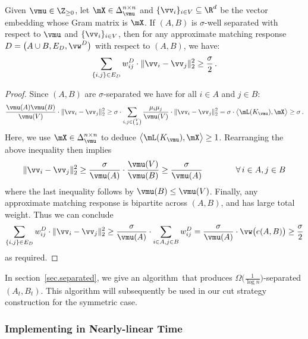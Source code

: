 \documentclass[letterpaper]{article}
\begin{document}
\begin{lemma}
\label{lem.sym-cut-strat.loss}
Given $\vmu \in \Z_{\geq 0}$, let $\mX \in \Delta_{\vmu}^{n \times n}$ and $\{ \vv_i \}_{i \in V} \subseteq \R^d$ be the vector embedding whose Gram matrix is $\mX$. If $(A, B)$ is $\sigma$-well separated with respect to $\vmu$ and $\{ \vv_i \}_{i \in V}$, then for any approximate matching response $D = \big( A \cup B, E_D, \vw^D \big)$ with respect to $(A, B)$, we have:
\begin{equation*}
\sum_{\{ i, j \} \in E_D} w_{ij}^{D} \cdot \lVert \vv_i - \vv_j \rVert_2^2
\geq {\sigma \over 2} \, .
\end{equation*}
\end{lemma}
\begin{proof}
Since $(A, B)$ are $\sigma$-separated we have for all $i \in A$ and $j \in B$:
\begin{equation*}
\frac{\vmu(A) \vmu(B)}{\vmu(V)} \cdot \lVert \vv_i - \vv_j \rVert^2_2
\geq \sigma \cdot \sum_{i,j \in \binom{V}{2}} \frac{\mu_i \mu_j}{\vmu(V)} \cdot \lVert \vv_i - \vv_j \rVert^2_2
= \sigma \cdot \big\langle \mL(K_{\vmu}), \mX \big\rangle
\geq \sigma \, .
\end{equation*}
Here, we use $\mX \in \Delta_{\vmu}^{n \times n}$ to deduce $\big\langle \mL(K_{\vmu}), \mX \big\rangle \geq 1$. Rearranging the above inequality then implies
\begin{equation*}
\lVert \vv_i - \vv_j \rVert_2^2
\geq \frac{\sigma}{\vmu(A)} \cdot \frac{\vmu(V)}{\vmu(B)}
\geq \frac{\sigma}{\vmu(A)}
\qquad\qquad
\forall \, i \in A, j \in B
\end{equation*}
where the last inequality follows by $\vmu(B) \leq \vmu(V)$. Finally, any approximate matching response is bipartite across $(A, B)$, and has large total weight. Thus we can conclude
\begin{equation*}
\sum_{\{ i, j \} \in E_D} w_{ij}^{D} \cdot \lVert \vv_i - \vv_j \rVert_2^2
\geq \frac{\sigma}{\vmu(A)} \cdot \sum_{i \in A, j \in B} w_{ij}^{D}
= \frac{\sigma}{\vmu(A)} \cdot \vw\big( e(A, B) \big)
\geq {\sigma \over 2}
\end{equation*}
as required.
\end{proof}

In section~\ref{sec.separated}, we give an algorithm~\roundcut that produces $\Omega\big( \frac{1}{\log n} \big)$-separated $(A_t, B_t)$. This algorithm will subsequently be used in our cut strategy construction for the symmetric case.


\subsubsection{Implementing \mmwu in Nearly-linear Time}
\label{sec.alg-cm.sym-cut-strat.nearly-linear-mmwu}
\end{document}

